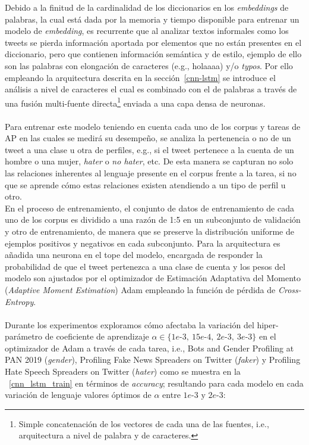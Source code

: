  	Debido a la finitud de la cardinalidad de los diccionarios en los \textit{embeddings} de palabras, la cual está dada por la memoria y tiempo disponible para entrenar un modelo de \textit{embedding}, es recurrente que al analizar textos informales como los tweets se pierda información aportada por elementos que no están presentes en el diccionario, pero que contienen información semántica y de estilo, ejemplo de ello son las palabras con elongación de caracteres (e.g., holaaaa) y/o \textit{typos}. Por ello empleando la arquitectura descrita en la sección~\ref{cnn-lstm} se introduce el análisis a nivel de caracteres el cual es combinado con el de palabras a través de una fusión multi-fuente directa\footnote{Simple concatenación de los vectores de cada una de las fuentes, i.e., arquitectura a nivel de palabra y de caracteres.} enviada a una capa densa de neuronas.
 	\\\\
 	Para entrenar este modelo teniendo en cuenta cada uno de los corpus y tareas de AP en las cuales se medirá su desempeño, se analiza la pertenencia o no de un tweet a una clase u otra de perfiles, e.g., si el tweet pertenece a la cuenta de un hombre o una mujer, \textit{hater }o \textit{no hater}, etc. De esta manera se capturan no solo las relaciones inherentes al lenguaje presente en el corpus frente a la tarea, si no que se aprende cómo estas relaciones existen atendiendo a un tipo de perfil u otro.
 	\\
 	En el proceso de entrenamiento, el conjunto de datos de entrenamiento de cada uno de los corpus es dividido a una razón de 1:5 en un subconjunto de validación y otro de entrenamiento, de manera que se preserve la distribución uniforme de ejemplos positivos y negativos en cada subconjunto.
 	Para la arquitectura es añadida una neurona en el tope del modelo, encargada de responder la probabilidad de que el tweet pertenezca a una clase de cuenta y los pesos del modelo son ajustados por el optimizador de Estimación Adaptativa del Momento (\textit{Adaptive Moment Estimation}) Adam \citep{DBLP:journals/corr/KingmaB14} empleando la función de pérdida de \textit{Cross-Entropy}.  	\\\\
 	Durante los experimentos exploramos cómo afectaba la variación del hiper-parámetro de coeficiente de aprendizaje $\alpha \in \{1e\text{-}3,~15e\text{-}4,~2e\text{-}3,~3e\text{-}3\}$  en el optimizador de Adam a través de cada tarea, i.e., Bots and Gender Profiling at PAN 2019 (\textit{gender}), Profiling Fake News Spreaders on Twitter (\textit{faker}) y Profiling Hate Speech Spreaders on Twitter (\textit{hater}) como se muestra en la \tablename~\ref{cnn_lstm_train} en términos de \textit{accuracy}; resultando para cada modelo en cada variación de lenguaje valores óptimos de  $\alpha$ entre $1e\text{-}3\text{ y }2e\text{-}3$:
